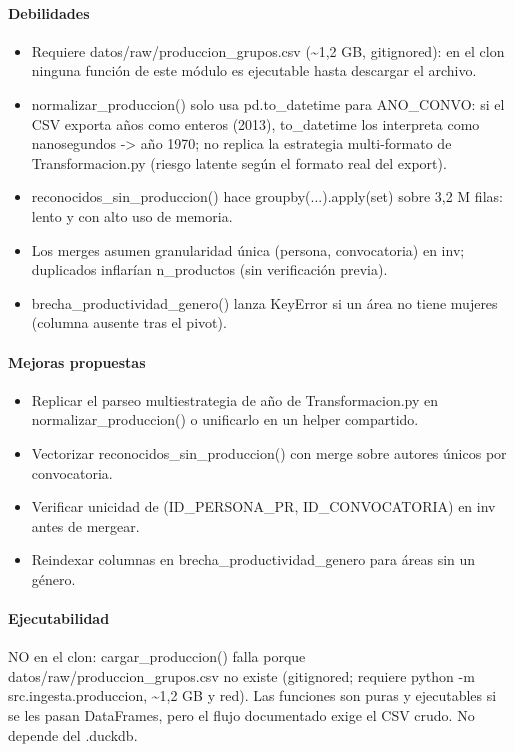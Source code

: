 \paragraph{Debilidades}
\begin{itemize}
  \item Requiere datos/raw/produccion\_grupos.csv (\textasciitilde{}1,2 GB, gitignored): en el clon ninguna función de este módulo es ejecutable hasta descargar el archivo.
  \item normalizar\_produccion() solo usa pd.to\_datetime para ANO\_CONVO: si el CSV exporta años como enteros (2013), to\_datetime los interpreta como nanosegundos -> año 1970; no replica la estrategia multi-formato de Transformacion.py (riesgo latente según el formato real del export).
  \item reconocidos\_sin\_produccion() hace groupby(...).apply(set) sobre 3,2 M filas: lento y con alto uso de memoria.
  \item Los merges asumen granularidad única (persona, convocatoria) en inv; duplicados inflarían n\_productos (sin verificación previa).
  \item brecha\_productividad\_genero() lanza KeyError si un área no tiene mujeres (columna ausente tras el pivot).
\end{itemize}

\paragraph{Mejoras propuestas}
\begin{itemize}
  \item Replicar el parseo multiestrategia de año de Transformacion.py en normalizar\_produccion() o unificarlo en un helper compartido.
  \item Vectorizar reconocidos\_sin\_produccion() con merge sobre autores únicos por convocatoria.
  \item Verificar unicidad de (ID\_PERSONA\_PR, ID\_CONVOCATORIA) en inv antes de mergear.
  \item Reindexar columnas en brecha\_productividad\_genero para áreas sin un género.
\end{itemize}

\paragraph{Ejecutabilidad}
NO en el clon: cargar\_produccion() falla porque datos/raw/produccion\_grupos.csv no existe (gitignored; requiere python -m src.ingesta.produccion, \textasciitilde{}1,2 GB y red). Las funciones son puras y ejecutables si se les pasan DataFrames, pero el flujo documentado exige el CSV crudo. No depende del .duckdb.

